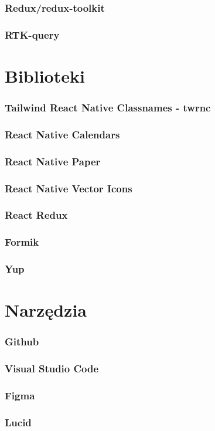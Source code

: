 \subsubsection*{\textbf{Redux/redux-toolkit}}
\phantom{Th}

\subsubsection*{\textbf{RTK-query}}
\phantom{Th}


\section{Biblioteki}
\subsubsection*{\textbf{Tailwind React Native Classnames - twrnc}}
\phantom{Th}

\subsubsection*{\textbf{React Native Calendars}}
\phantom{Th}

\subsubsection*{\textbf{React Native Paper}}
\phantom{Th}

\subsubsection*{\textbf{React Native Vector Icons}}
\phantom{Th}

\subsubsection*{\textbf{React Redux}}
\phantom{Th}

\subsubsection*{\textbf{Formik}}
\phantom{Th}

\subsubsection*{\textbf{Yup}}
\phantom{Th}


\section{Narzędzia}
\subsubsection*{\textbf{Github}}
\phantom{Th}

\subsubsection*{\textbf{Visual Studio Code}}
\phantom{Th}

\subsubsection*{\textbf{Figma}}
\phantom{Th}

\subsubsection*{\textbf{Lucid}}
\phantom{Th}